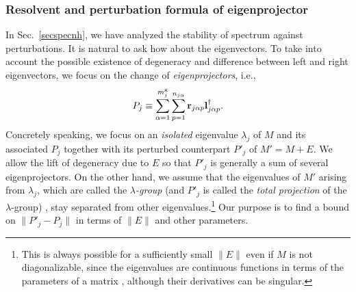 \documentclass{tADP2e}
\theoremstyle{plain}
\theoremstyle{plain}
\theoremstyle{definition}
\begin{document}
\subsubsection{Resolvent and perturbation formula of eigenprojector\label{sec2resolvent}}
In Sec.~\ref{secspecnh}, we have analyzed the stability of spectrum against perturbations. It is natural to ask how about the eigenvectors. To take into account the possible existence of degeneracy and difference between left and right eigenvectors, we focus on the change of \emph{eigenprojectors}, i.e., 
\begin{equation}
P_j\equiv\sum^{m^{\rm g}_j}_{\alpha=1}\sum^{n_{j\alpha}}_{p=1} \bold{r}_{j\alpha p}\bold{l}_{j\alpha p}^\dag.
\label{eproj}
\end{equation}
Concretely speaking, we focus on an \emph{isolated} eigenvalue $\lambda_j$ of $M$ and its associated $P_j$ together with its perturbed counterpart $P'_j$ of $M'=M+E$. We allow the lift of degeneracy due to $E$ so that $P'_j$ is generally a sum of several eigenprojectors. On the other hand, we assume that the eigenvalues of $M'$ arising from $\lambda_j$, which are called the \emph{$\lambda$-group} (and $P'_j$ is called the \emph{total projection} of the $\lambda$-group) \cite{TK80}, stay separated from other eigenvalues.\footnote{This is always possible for a sufficiently small $\|E\|$ even if $M$ is not diagonalizable, since the eigenvalues are continuous functions in terms of the parameters of a matrix \cite{TK80}, although their derivatives can be singular.} Our purpose is to find a bound on $\|P'_j-P_j\|$ in terms of $\|E\|$ and other parameters.
\end{document}
